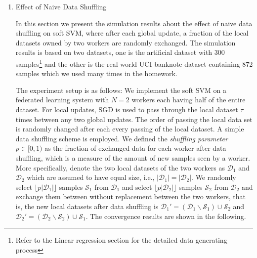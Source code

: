 \documentclass[11pt, fullpage,letterpaper]{article}
\begin{document}
\begin{enumerate}
\item Effect of Naive Data Shuffling

In this section we present the simulation results about the effect of naive data shuffling on soft SVM, where after each global update, a fraction of the local datasets owned by two workers are randomly exchanged. The simulation results is based on two datasets, one is the artificial dataset with 300 samples\footnote{Refer to the Linear regression section for the detailed data generating process} and the other is the real-world UCI banknote dataset containing 872 samples which we used many times in the homework.

The experiment setup is as follows: We implement the soft SVM on a federated learning system with $N=2$ workers each having half of the entire dataset. For local updates, SGD is used to pass through the local dataset $\tau$ times between any two global updates. The order of passing the local data set is randomly changed after each every passing of the local dataset. A simple data shuffling scheme is employed. We defined the \emph{shuffling parameter $p\in[0,1)$} as the fraction of exchanged data for each worker after data shuffling, which is a measure of the amount of new samples seen by a worker. More specifically, denote the two local datasets of the two workers as $\mathcal{D}_1$ and $\mathcal{D}_2$ which are assumed to have equal size, i.e., $|\mathcal{D}_1|=|\mathcal{D}_2| $. We randomly select $\lfloor p|\mathcal{D}_1|\rfloor$ samples $\mathcal{S}_1$ from $\mathcal{D}_1$ and select $\lfloor p|\mathcal{D}_2|\rfloor$ samples $\mathcal{S}_2$ from $\mathcal{D}_2$ and exchange them between without replacement between the two workers, that is, the new local datasets after data shuffling is $\mathcal{D}_1'=(\mathcal{D}_1\backslash \mathcal{S}_1) \cup \mathcal{S}_2$ and $\mathcal{D}_2'=(\mathcal{D}_2\backslash \mathcal{S}_2) \cup \mathcal{S}_1$. The convergence results are shown in the following.


\end{enumerate}
\end{document}

